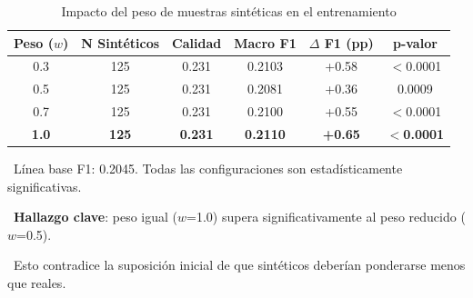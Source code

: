 \begin{table}[htbp]
\centering
\caption{Impacto del peso de muestras sintéticas en el entrenamiento}
\label{tab:weight_validation}
\begin{tabular}{cccccc}
\toprule
\textbf{Peso ($w$)} & \textbf{N Sintéticos} & \textbf{Calidad} & \textbf{Macro F1} & \textbf{$\Delta$ F1 (pp)} & \textbf{p-valor} \\
\midrule
0.3 & 125 & 0.231 & 0.2103 & +0.58 & $<$0.0001 \\
0.5 & 125 & 0.231 & 0.2081 & +0.36 & 0.0009 \\
0.7 & 125 & 0.231 & 0.2100 & +0.55 & $<$0.0001 \\
\rowcolor{green!20}
\textbf{1.0} & \textbf{125} & \textbf{0.231} & \textbf{0.2110} & \textbf{+0.65} & $<$\textbf{0.0001} \\
\bottomrule
\end{tabular}
\vspace{0.5em}\footnotesize

\textbullet\ Línea base F1: 0.2045. Todas las configuraciones son estadísticamente significativas.

\textbullet\ \textbf{Hallazgo clave}: peso igual ($w$=1.0) supera significativamente al peso reducido ($w$=0.5).

\textbullet\ Esto contradice la suposición inicial de que sintéticos deberían ponderarse menos que reales.

\end{table}
